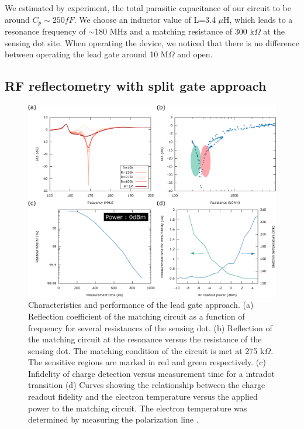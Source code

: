 \documentclass{article}
\begin{document}
	\\ \\ 
	We estimated by experiment, the total parasitic capacitance of our circuit to be around $C_p \sim 250fF$. We choose an inductor value of L=3.4 $\mu$H, which leads to a resonance frequency of $\sim$180 MHz and a matching resistance of 300 k$\Omega$ at the sensing dot site.
	When operating the device, we noticed that there is no difference between operating the lead gate around 10 M$\Omega$ and open.

\subsection{RF reflectometry with split gate approach}

	\begin{figure}
		\includegraphics[width=\textwidth]{figures/Performance_figure/perfomance_fig.eps}
		\caption{Characteristics and performance of the lead gate approach. (a) Reflection coefficient of the matching circuit as a function of frequency for several resistances of the sensing dot. (b) Reflection of the matching circuit at the resonance versus the resistance of the sensing dot. The matching condition of the circuit is met at 275 k$\Omega$. The sensitive regions are marked in red and green respectively. (c) Infidelity of charge detection versus measurement time for a intradot transition (d) Curves showing the relationship between the charge readout fidelity and the electron temperature versus the applied power to the matching circuit. The electron temperature was determined by measuring the polarization line \cite{van2018automated}. }
		\label{fig:lead_gate_result}
	\end{figure}	
\end{document}
